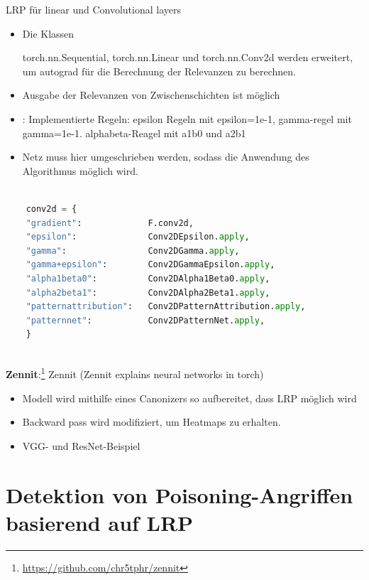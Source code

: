 \documentclass[11pt,a4paper]{article}
\numberwithin{equation}{section}
\begin{document}
	
	
	\noindent LRP für linear und Convolutional layers
	
	\begin{itemize}
		\item Die Klassen
		
		torch.nn.Sequential, torch.nn.Linear und torch.nn.Conv2d werden erweitert, um autograd für die Berechnung der Relevanzen zu berechnen.
		
		\item Ausgabe der Relevanzen von Zwischenschichten ist möglich
		\item: Implementierte Regeln: epsilon Regeln mit epsilon=1e-1, gamma-regel mit gamma=1e-1. alphabeta-Reagel mit a1b0 und a2b1
		\item Netz muss hier umgeschrieben werden, sodass die Anwendung des Algorithmus möglich wird.
	\end{itemize}
	
	\begin{lstlisting}[language=Python, caption=Implementierte Regeln fhvilshoj]
	
	conv2d = {
	"gradient":             F.conv2d,
	"epsilon":              Conv2DEpsilon.apply,
	"gamma":                Conv2DGamma.apply,
	"gamma+epsilon":        Conv2DGammaEpsilon.apply,
	"alpha1beta0":          Conv2DAlpha1Beta0.apply,
	"alpha2beta1":          Conv2DAlpha2Beta1.apply,
	"patternattribution":   Conv2DPatternAttribution.apply,
	"patternnet":           Conv2DPatternNet.apply,
	}
	
	\end{lstlisting}
	
	\noindent \textbf{Zennit}:\footnote{\url{https://github.com/chr5tphr/zennit}}
	Zennit (Zennit explains neural networks in torch) 
	\begin{itemize}
		\item Modell wird mithilfe eines Canonizers so aufbereitet, dass LRP möglich wird
		\item Backward pass wird modifiziert, um Heatmaps zu erhalten.
		\item VGG- und ResNet-Beispiel
	\end{itemize}
	\section{Detektion von Poisoning-Angriffen basierend auf LRP} \label{chapter_algorithm}
	
\end{document}
